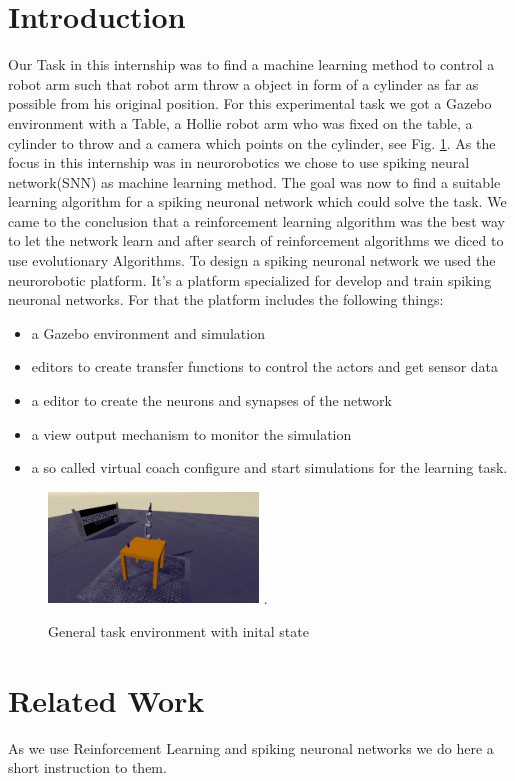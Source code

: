 \section{Introduction}
\label{sec:introtduction}
Our Task in this internship was to find a machine learning method to control a robot arm such that robot arm throw a object in form of a cylinder as far as possible from his original position. For this experimental task we got a Gazebo environment with a Table, a Hollie robot arm who was fixed on the table, a cylinder to throw and a camera which points on the cylinder, see Fig. \ref{init_state}.
As the focus in this internship was in neurorobotics we chose to use spiking neural network(SNN) as machine learning method. The goal was now to find a suitable learning algorithm for a spiking neuronal network which could solve the task. We came to the conclusion that a reinforcement learning algorithm was the best way to let the network learn and after search of reinforcement algorithms we diced to use evolutionary Algorithms. 
To design a spiking neuronal network we used the neurorobotic platform. It's a platform specialized for develop and train spiking neuronal networks. For that the platform includes the following things:
 \begin{itemize}
\item a Gazebo environment and simulation
\item editors to create transfer functions to control the actors and get sensor data
\item a editor to create the neurons and synapses of the network
\item a view output mechanism to monitor the simulation
\item a so called virtual coach configure and start simulations for the learning task.
\end{itemize} 
\begin{figure}[H]
	\centering
	\includegraphics[width=2.2in]{img/init_state.png}
	\DeclareGraphicsExtensions.
	\caption{General task environment with inital state }
	\label{init_state}
\end{figure}
\section{Related Work}
As we use Reinforcement Learning and spiking neuronal networks we do here a short instruction to them.
